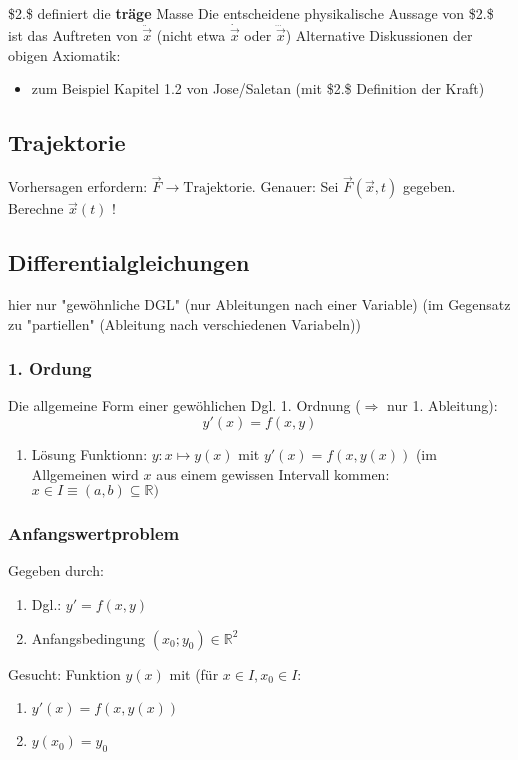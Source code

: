 \documentclass[11pt]{article}
\renewcommand{\v}[1]{\vec{#1}}
\begin{document}
\$2.\$ definiert die \textbf{träge} Masse
Die entscheidene physikalische Aussage von \$2.\$ ist das Auftreten von $\ddot{\v x}$ (nicht etwa $\dot{\v x}$ oder $\dddot{\v x}$)
Alternative Diskussionen der obigen Axiomatik:
\begin{itemize}
\item zum Beispiel Kapitel 1.2 von Jose/Saletan (mit \$2.\$ Definition der Kraft)
\end{itemize}
\subsection{Trajektorie}
\label{sec-2-2}
Vorhersagen erfordern: $\v F \rightarrow \text{Trajektorie}$. Genauer: Sei $\v F(\v x,t)$ gegeben. Berechne $\v x(t)$ !
\subsection{Differentialgleichungen}
\label{sec-2-3}
hier nur "gewöhnliche DGL" (nur Ableitungen nach einer Variable) (im Gegensatz zu "partiellen" (Ableitung nach verschiedenen Variabeln))
\subsubsection{1. Ordung}
\label{sec-2-3-1}
Die allgemeine Form einer gewöhlichen Dgl. 1. Ordnung ($\Rightarrow$ nur 1. Ableitung):
\[y'(x) = f(x,y)\]
\begin{enumerate}
\item Lösung
\label{sec-2-3-1-1}
Funktionn: $y:x\mapsto y(x)$ mit $y'(x) = f(x,y(x))$ (im Allgemeinen wird $x$ aus einem gewissen Intervall kommen: $x\in I\equiv (a,b)\subseteq \mathbb{R})$
\end{enumerate}
\subsubsection{Anfangswertproblem}
\label{sec-2-3-2}
Gegeben durch:
\begin{enumerate}
\item Dgl.: $y' = f(x,y)$
\item Anfangsbedingung $(x_0;y_0) \in \mathbb{R}^2$
\end{enumerate}
Gesucht: Funktion $y(x)$ mit (für $x\in I, x_0 \in I$:
\begin{enumerate}
\item $y'(x) = f(x,y(x))$
\item $y(x_0) = y_0$
\end{enumerate}
\end{document}
